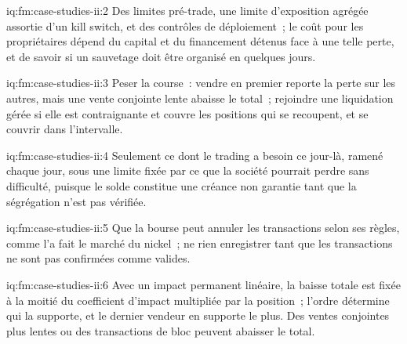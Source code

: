 \begin{solution}{iq:fm:case-studies-ii:2}
Des limites pré-trade, une limite d'exposition agrégée assortie d'un kill switch, et des contrôles de déploiement~; le coût pour les propriétaires dépend du capital et du financement
détenus face à une telle perte, et de savoir si un sauvetage doit être organisé en quelques jours.
\end{solution}

\begin{solution}{iq:fm:case-studies-ii:3}
Peser la course~: vendre en premier reporte la perte sur les autres, mais une vente conjointe lente abaisse le total~; rejoindre une liquidation gérée si elle est contraignante et
couvre les positions qui se recoupent, et se couvrir dans l'intervalle.
\end{solution}

\begin{solution}{iq:fm:case-studies-ii:4}
Seulement ce dont le trading a besoin ce jour-là, ramené chaque jour, sous une limite fixée par ce que la société pourrait perdre sans difficulté, puisque le solde constitue une
créance non garantie tant que la ségrégation n'est pas vérifiée.
\end{solution}

\begin{solution}{iq:fm:case-studies-ii:5}
Que la bourse peut annuler les transactions selon ses règles, comme l'a fait le marché du nickel~; ne rien enregistrer tant que les transactions ne sont pas confirmées comme valides.
\end{solution}

\begin{solution}{iq:fm:case-studies-ii:6}
Avec un impact permanent linéaire, la baisse totale est fixée à la moitié du coefficient d'impact multipliée par la position~; l'ordre détermine qui la supporte, et le
dernier vendeur en supporte le plus. Des ventes conjointes plus lentes ou des transactions de bloc peuvent abaisser le total.
\end{solution}
